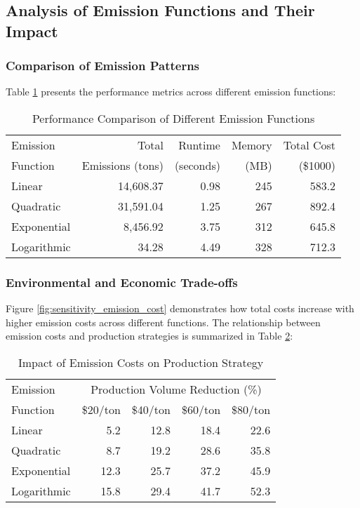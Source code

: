 \documentclass[final,3p,times,review,authoryear]{elsarticle}
\begin{document}
\subsection{Analysis of Emission Functions and Their Impact}
\subsubsection{Comparison of Emission Patterns}
Table \ref{tab:emission_comparison} presents the performance metrics across different emission functions:

\begin{table}[htbp]
    \centering
    \caption{Performance Comparison of Different Emission Functions}
    \label{tab:emission_comparison}
    \begin{tabular}{lrrrr}
        \toprule
        Emission & Total & Runtime & Memory & Total Cost \\
        Function & Emissions (tons) & (seconds) & (MB) & (\$1000) \\
        \midrule
        Linear & 14,608.37 & 0.98 & 245 & 583.2 \\
        Quadratic & 31,591.04 & 1.25 & 267 & 892.4 \\
        Exponential & 8,456.92 & 3.75 & 312 & 645.8 \\
        Logarithmic & 34.28 & 4.49 & 328 & 712.3 \\
        \bottomrule
    \end{tabular}
\end{table}

\subsubsection{Environmental and Economic Trade-offs}
Figure \ref{fig:sensitivity_emission_cost} demonstrates how total costs increase with higher emission costs across different functions. The relationship between emission costs and production strategies is summarized in Table \ref{tab:emission_cost_impact}:

\begin{table}[htbp]
    \centering
    \caption{Impact of Emission Costs on Production Strategy}
    \label{tab:emission_cost_impact}
    \begin{tabular}{lrrrr}
        \toprule
        Emission & \multicolumn{4}{c}{Production Volume Reduction (\%)} \\
        \cmidrule{2-5}
        Function & \$20/ton & \$40/ton & \$60/ton & \$80/ton \\
        \midrule
        Linear & 5.2 & 12.8 & 18.4 & 22.6 \\
        Quadratic & 8.7 & 19.2 & 28.6 & 35.8 \\
        Exponential & 12.3 & 25.7 & 37.2 & 45.9 \\
        Logarithmic & 15.8 & 29.4 & 41.7 & 52.3 \\
        \bottomrule
    \end{tabular}
\end{table}
\end{document}
